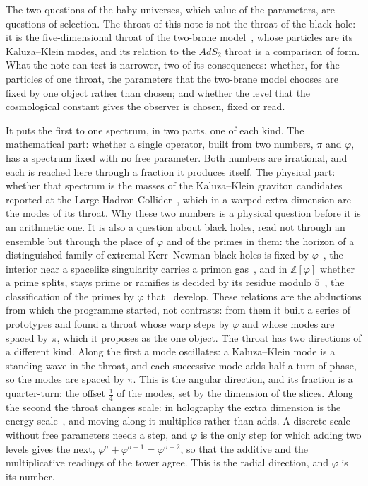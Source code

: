 \documentclass[11pt,reqno]{amsart}
\newcommand{\golden}{\varphi}
\numberwithin{equation}{section}
\theoremstyle{remark}
\begin{document}
The two questions of the baby universes, which value of the parameters, are
questions of selection. The throat of this note is not the throat of the black hole: it is the
five-dimensional throat of the two-brane model~\cite{RS99}, whose particles are its Kaluza--Klein
modes, and its relation to the $AdS_2$ throat is a comparison of form. What the note can test is narrower, two of its consequences: whether, for the particles of one
throat, the parameters that the two-brane model chooses are fixed by one object rather than chosen;
and whether the level that the cosmological constant gives the observer is chosen, fixed or read.

It puts the first to one spectrum, in two parts, one of each kind. The mathematical part:
whether a single operator, built from two numbers, $\pi$ and $\golden$, has a spectrum fixed with no
free parameter. Both numbers are irrational, and each is reached here through a fraction it produces
itself. The physical part: whether that spectrum is the masses of the Kaluza--Klein graviton
candidates reported at the Large Hadron Collider~\cite{LYR26}, which in a warped extra dimension are
the modes of its throat. Why these two numbers is a physical question before it is an arithmetic one. It
is also a question about black holes, read not through an ensemble but through the place of $\golden$
and of the primes in them: the horizon of a distinguished family of extremal Kerr--Newman black holes
is fixed by $\golden$~\cite{SN24}, the interior near a spacelike singularity carries a primon
gas~\cite{Jul90,HY25,DCHY25}, and in $\mathbb Z[\golden]$ whether a prime splits, stays prime or
ramifies is decided by its residue modulo $5$~\cite{Neu99}, the classification of the primes by
$\golden$ that~\cite{GH23,CW6} develop. These relations are the abductions from which the programme
started, not contrasts: from them it built a series of prototypes and found a throat whose warp steps
by $\golden$ and whose modes are spaced by $\pi$, which it proposes as the one object. The throat has two
directions of a different kind. Along the first a mode oscillates: a Kaluza--Klein mode is a standing
wave in the throat, and each successive mode adds half a turn of phase, so the modes are spaced by
$\pi$. This is the angular direction, and its fraction is a quarter-turn: the offset $\tfrac14$ of the
modes, set by the dimension of the slices. Along the second the throat changes scale: in holography
the extra dimension is the energy scale~\cite{SW98}, and moving along it multiplies rather than adds.
A discrete scale without free parameters needs a step, and $\golden$ is the only step for which adding
two levels gives the next, $\golden^{\sigma}+\golden^{\sigma+1}=\golden^{\sigma+2}$, so that the
additive and the multiplicative readings of the tower agree. This is the radial direction, and
$\golden$ is its number.
\end{document}
